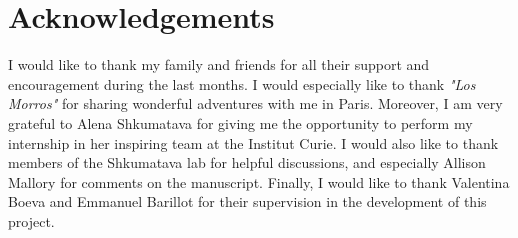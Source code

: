\documentclass[a4paper,12pt,oneside]{article}
\begin{document}
	\newpage

	\tableofcontents

	\newpage

	

	

	

	

	\section*{Acknowledgements}

		I would like to thank my family and friends for all their support and encouragement during the last months. I would especially like to thank \textit{"Los Morros"} for sharing wonderful adventures with me in Paris. Moreover, I am very grateful to Alena Shkumatava for giving me the opportunity to perform my internship in her inspiring team at the Institut Curie. I would also like to thank members of the Shkumatava lab for helpful discussions, and especially Allison Mallory for comments on the manuscript. Finally, I would like to thank Valentina Boeva and Emmanuel Barillot for their supervision in the development of this project.\\

	
\end{document}
